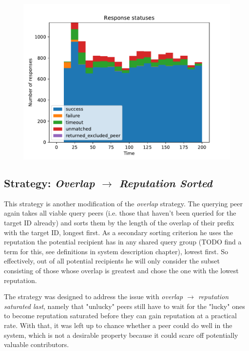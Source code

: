 \begin{figure}[t]
\centering
\includegraphics[width=1\columnwidth]{figures/selection_overlap_high_rep_last_resp_statuses}
\label{fig:selection_overlap_high_rep_last_resp_statuses}
\end{figure}

\subsection{Strategy: \emph{Overlap $\rightarrow$ Reputation Sorted}}
This strategy is another modification of the \emph{overlap} strategy. The
querying peer again takes all viable query peers (i.e. those that haven't been
queried for the target ID already) and sorts them by the length of the overlap
of their prefix with the target ID, longest first. As a secondary sorting
criterion he uses the reputation the potential recipient has in any shared query
group (TODO find a term for this, see definitions in system description
chapter), lowest first. So effectively, out of all potential recipients he will
only consider the subset consisting of those whose overlap is greatest and chose
the one with the lowest reputation.

The strategy was designed to address the issue with \emph{overlap $\rightarrow$
reputation saturated last}, namely that "unlucky" peers still have to wait for
the "lucky" ones to become reputation saturated before they can gain reputation
at a practical rate. With that, it was left up to chance whether a peer could do
well in the system, which is not a desirable property because it could scare off
potentially valuable contributors.

